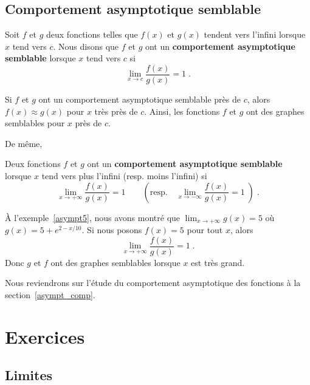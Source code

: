 {\subsection{Comportement asymptotique semblable \life}

\begin{defn}
Soit $f$ et $g$ deux fonctions telles que $f(x)$ et $g(x)$ tendent
vers l'infini lorsque $x$ tend vers $c$.  Nous disons que $f$ et $g$ ont un
{\bfseries comportement asymptotique semblable} lorsque $x$ tend vers
$c$ si
\[
\lim_{x\rightarrow c} \frac{f(x)}{g(x)} = 1 \; .
\]
\end{defn}

Si $f$ et $g$ ont un comportement asymptotique semblable près de $c$,
alors $f(x) \approx g(x)$ pour $x$ très près de $c$.  Ainsi, les fonctions
$f$ et $g$ ont des graphes semblables pour $x$ près de $c$.

De même,

\begin{defn} 
Deux fonctions $f$ et $g$ ont un
{\bfseries comportement asymptotique semblable} lorsque $x$ tend vers
plus l'infini (resp. moins l'infini) si
\[
\lim_{x\rightarrow +\infty} \frac{f(x)}{g(x)} = 1 \qquad
(\text{resp.}\quad
\lim_{x\rightarrow -\infty} \frac{f(x)}{g(x)} = 1 \;) \; .
\]
\end{defn}

\begin{egg}
À l'exemple~\ref{asympt5}, nous avons montré que
$\displaystyle \lim_{x\rightarrow +\infty} g(x) = 5$ 
où $\displaystyle g(x)= 5 + e^{2-x/10}$.  Si nous posons $f(x) = 5$ pour
tout $x$, alors
\[
\lim_{x\rightarrow +\infty} \frac{f(x)}{g(x)} = 1 \; .
\]
Donc $g$ et $f$ ont des graphes semblables lorsque $x$ est très grand.
\end{egg}

Nous reviendrons sur l'étude du comportement asymptotique des
fonctions à la section~\ref{asympt_comp}.

}  %

\section{Exercices}

\subsection{Limites}

